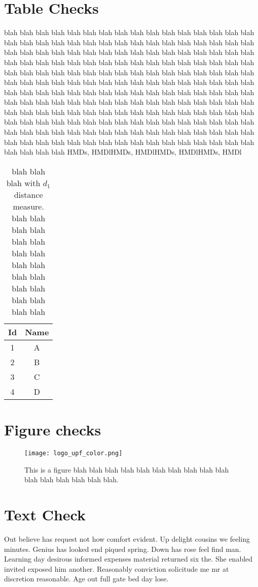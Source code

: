 \section{Table Checks}
blah blah blah blah blah blah blah blah blah blah blah blah blah blah blah blah blah blah blah blah blah blah blah blah blah blah blah blah blah blah blah blah blah blah blah blah blah blah blah blah blah blah blah blah blah blah blah blah blah blah blah blah blah blah blah blah blah blah blah blah blah blah blah blah blah blah blah blah blah blah blah blah blah blah blah blah blah blah blah blah blah blah blah blah blah blah blah blah blah blah blah blah blah blah blah blah blah blah blah blah blah blah blah blah blah blah blah blah blah blah blah blah blah blah blah blah blah blah blah blah blah blah blah blah blah blah blah blah blah blah blah blah blah blah blah blah blah blah blah blah blah blah blah blah blah blah blah blah blah blah blah blah blah blah blah blah blah blah blah blah blah blah blah blah blah blah blah blah blah blah blah blah blah blah blah blah blah blah blah blah blah blah blah blah blah blah blah blah blah blah blah blah blah blah blah blah \gls{HMDs}, \gls{HMDl}\gls{HMDs}, \gls{HMDl}\gls{HMDs}, \gls{HMDl}\gls{HMDs}, \gls{HMDl}
\begin{table}[h]
\tabcolsep=0.1cm
\begin{center}
\begin{tabular}{|c|c|}
\hline 
Id & Name \tabularnewline \hline \hline 
1 & A \tabularnewline \hline \hline 
2 & B \tabularnewline \hline \hline 
3 & C \tabularnewline \hline \hline 
4 & D \tabularnewline \hline
\end{tabular}
\end{center}
\caption[In the TOC entry - 1]{blah blah blah  with $d_1$ distance measure. blah blah blah blah blah blah blah blah blah blah blah blah blah blah blah blah blah blah}\label{tab:Check}
\end{table}
\section{Figure checks}
\begin{figure}[ht]
\begin{center}
\texttt{[image: logo\_upf\_color.png]}
\caption{This is a figure blah blah blah blah blah blah blah blah blah blah blah blah blah blah blah blah.} \label{fig:Check}
\end{center}
\end{figure}
\section{Text Check}
Out believe has request not how comfort evident. Up delight cousins we feeling minutes. Genius has looked end piqued spring. Down has rose feel find man. Learning day desirous informed expenses material returned six the. She enabled invited exposed him another. Reasonably conviction solicitude me mr at discretion reasonable. Age out full gate bed day lose. 

